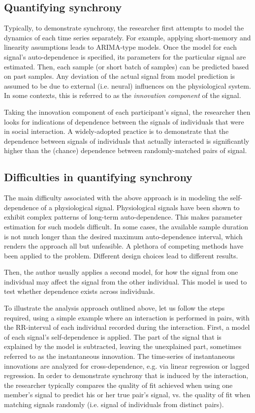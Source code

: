 \documentclass[a4paper, 11pt]{article}      %
\begin{document}
\subsection{Quantifying synchrony}
Typically, to demonstrate synchrony, the researcher first attempts to model the dynamics of each time series separately. For example, applying short-memory and linearity assumptions leads to ARIMA-type models. Once the model for each signal's auto-dependence is specified, its parameters for the particular signal are estimated. Then, each sample (or short batch of samples) can be predicted based on past samples. Any deviation of the actual signal from model prediction is assumed to be due to external (i.e. neural) influences on the physiological system. In some contexts, this is referred to as the \emph{innovation component} of the signal. 

Taking the innovation component of each participant's signal, the researcher then looks for indications of dependence between the signals of individuals that were in social interaction. A widely-adopted practice is to demonstrate that the dependence between signals of individuals that actually interacted is significantly higher than the (chance) dependence between randomly-matched pairs of signal.

\subsection{Difficulties in quantifying synchrony}
The main difficulty associated with the above approach is in modeling the self-dependence of a physiological signal. Physiological signals have been shown to exhibit complex patterns of long-term auto-dependence. This makes parameter estimation for such models difficult. In some cases, the available sample duration is not much longer than the desired maximum auto-dependence interval, which renders the approach all but unfeasible. A plethora of competing methods have been applied to the problem. Different design choices lead to different results.

Then, the author usually applies a second model, for how the signal from one individual may affect the signal from the other individual. This model is used to test whether dependence exists across individuals. 

To illustrate the analysis approach outlined above, let us follow the steps required, using a simple example where an interaction is performed in pairs, with the RR-interval of each individual recorded during the interaction. First, a model of each signal's self-dependence is applied. The part of the signal that is explained by the model is subtracted, leaving the unexplained part, sometimes referred to as the instantaneous innovation. The time-series of instantaneous innovations are analyzed for cross-dependence, e.g. via linear regression or lagged regression. In order to demonstrate synchrony that is induced by the interaction, the researcher typically compares the quality of fit achieved when using one member's signal to predict his or her true pair's signal, vs. the quality of fit when matching signals randomly (i.e. signal of individuals from distinct pairs).
\end{document}
